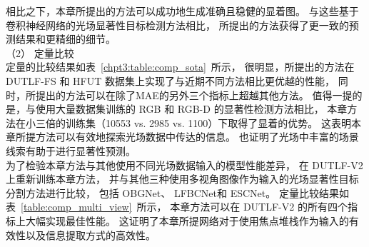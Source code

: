 相比之下，本章所提出的方法可以成功地生成准确且稳健的显着图。
与这些基于卷积神经网络的光场显著性目标检测方法相比，
所提出的方法获得了更一致的预测结果和更精细的细节。
\\
%
%
%
%
\indent
（2）
定量比较
\\
%
%
%
%
\indent
定量的比较结果如表~\ref{chpt3:table:comp_sota}~所示，
很明显，所提出的方法在 DUTLF-FS 和 HFUT 数据集上实现了与近期不同方法相比更优越的性能，
同时，所提出的方法可以在除了MAE的另外三个指标上超越其他方法。 
值得一提的是，与使用大量数据集训练的 RGB 和 RGB-D 的显著性检测方法相比，
本章方法在小三倍的训练集（10553 vs. 2985 vs. 1100）下取得了显着的优势。 
这表明本章所提方法可以有效地探索光场数据中传达的信息。 
也证明了光场中丰富的场景线索有助于进行显著性预测。
\\
%
%
%
%
\indent
为了检验本章方法与其他使用不同光场数据输入的模型性能差异，
在 DUTLF-V2 上重新训练本章方法，
并与其他三种使用多视角图像作为输入的光场显著性目标分割方法进行比较，
包括 OBGNet、
LFBCNet和
ESCNet。 
定量比较结果如表~\ref{table:comp_multi_view}~所示，
本章方法可以在 DUTLF-V2 的所有四个指标上大幅实现最佳性能。 
这证明了本章所提网络对于使用焦点堆栈作为输入的有效性以及信息提取方式的高效性。 
